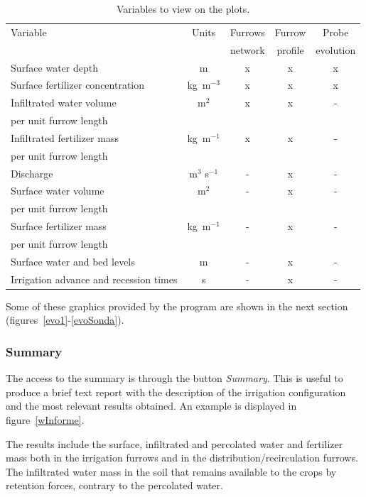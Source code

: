 \documentclass[review,authoryear]{elsarticle}
\begin{document}
\begin{table}[ht]\footnotesize
\caption{Variables to view on the plots.}
\label{tableVariables}
\begin{center}
\begin{tabular}{lcccc}
\hline
Variable & Units & Furrows & Furrow & Probe \\
& & network & profile & evolution\\
\hline
Surface water depth & m & x & x & x \\
Surface fertilizer concentration & kg~m$^{-3}$ & x & x & x \\
Infiltrated water volume & m$^2$ & x & x & - \\
\hspace{3mm} per unit furrow length \\
Infiltrated fertilizer mass & kg~m$^{-1}$ & x & x & - \\
\hspace{3mm} per unit furrow length \\
Discharge & m$^3$ s$^{-1}$ & - & x & - \\
Surface water volume & m$^2$ & - & x & - \\
\hspace{3mm} per unit furrow length \\
Surface fertilizer mass & kg~m$^{-1}$ & - & x & - \\
\hspace{3mm} per unit furrow length \\
Surface water and bed levels & m & - & x & - \\
Irrigation advance and recession times & s & - & x & - \\
\hline
\end{tabular}
\end{center}
\end{table}

Some of these graphics provided by the program are shown in the next section
(figures~\ref{evo1}-\ref{evoSonda}).

\subsubsection{Summary}

The access to the summary is through the button \emph{Summary}. This is useful
to produce a brief text report with the description of the irrigation
configuration and the most relevant results obtained. An example is displayed in
figure~\ref{wInforme}.

The results include the surface, infiltrated and percolated water and fertilizer
mass both in the irrigation furrows and in the distribution/recirculation
furrows. The infiltrated water mass in the soil that remains available to the
crops by retention forces, contrary to the percolated water.
\end{document}
